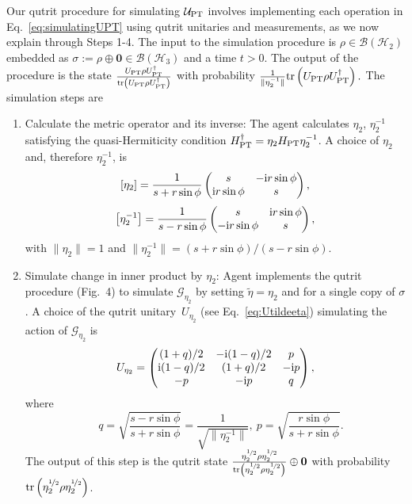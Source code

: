 \documentclass[amsmath,amssymb,aps,pra,superscriptaddress,twocolumn]{revtex4-2}
\begin{document}
\begin{appendix}
Our qutrit procedure for simulating $\mathcal{U}_{\rm PT}$ involves implementing each operation in Eq.~\eqref{eq:simulatingUPT}
using qutrit unitaries and measurements, as we now explain through Steps 1-4.
The input to the simulation procedure is $\rho \in \mathcal{B}(\mathscr{H}_2)$ 
embedded as $\sigma:= \rho\oplus \bm{0} \in \mathcal{B}(\mathscr{H}_3)$ and a time $t>0$.
The output of the procedure is the state $\frac{U_{\rm{PT}}\rho U^\dagger_{\rm{PT}}}{{\rm tr}\left( U_{\rm{PT}}\rho U^\dagger_{\rm{PT}}\right)}$
with probability $\frac{1}{\|\eta_2^{-1}\|}{\rm tr}\left( U_{\rm{PT}}\rho U^\dagger_{\rm{PT}}\right).$
The simulation steps are
\begin{enumerate}
    \item Calculate the metric operator and its inverse:
    The agent calculates $\eta_2$, $\eta_2^{-1}$ satisfying the quasi-Hermiticity condition $H^\dagger_{\rm PT} = \eta_2H_{\rm PT}\eta^{-1}_2$.
    A choice of $\eta_2$ and, therefore $\eta_2^{-1}$, is
\begin{equation}
    \left[\eta_2\right] = \frac{1}{s+r\sin\phi}\begin{pmatrix}
    s & -{\rm i}r\sin\phi \\{\rm i}r\sin\phi & s \end{pmatrix},
\end{equation}
\begin{equation}
    \left[\eta_2^{-1}\right] = \frac{1}{s-r\sin\phi}\begin{pmatrix}
    s & {\rm i}r\sin\phi \\-{\rm i}r\sin\phi & s \end{pmatrix},
\end{equation}
with $\|\eta_2\|=1$ and $\|\eta_2^{-1}\| =(s+r\sin\phi)/(s-r\sin\phi)$.

\item Simulate change in inner product by $\eta_2$: 
Agent implements the qutrit procedure (Fig.~4) to simulate $\mathcal{G}_{{\eta}_2}$ 
by setting $\tilde{\eta} = \eta_2$ and for a single copy of $\sigma$.
A choice of the qutrit unitary~$U_{{\eta}_2}$ (see Eq.~\eqref{eq:Utildeeta})
simulating the action of  $\mathcal{G}_{\eta_2}$ is
\begin{equation}\label{eq:Ueta2}
    U_{{\eta}_2} = \begin{pmatrix}
    (1+q)/2 & -{\rm i}(1-q)/2 & p \\
    {\rm i}(1-q)/2 & (1+q)/2 & -{\rm i}p \\
    -p & -{\rm i}p & q
    \end{pmatrix},
\end{equation}
where
\begin{equation}
    \quad q = \sqrt{\frac{s-r\sin\phi}{s+r\sin\phi}} = \frac{1}{\sqrt{\|\eta_2^{-1}\|}}, \  p = \sqrt{\frac{r\sin\phi}{s+r\sin\phi}}.
\end{equation}
The output of this step is the qutrit state 
$\frac{\eta_2^{\nicefrac{1}{2}}\rho\eta_2^{\nicefrac{1}{2}}}{{\rm tr}\left(\eta_2^{\nicefrac{1}{2}}\rho\eta_2^{\nicefrac{1}{2}}\right)}\oplus\bm{0} $
with probability ${\rm tr}\left(\eta_2^{\nicefrac{1}{2}}\rho\eta_2^{\nicefrac{1}{2}}\right)$.


\end{enumerate}
\end{appendix}
\end{document}
